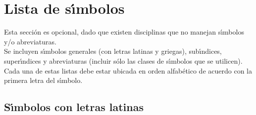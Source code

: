 \chapter*{Lista de s\'{\i}mbolos}
Esta secci\'{o}n es opcional, dado que existen disciplinas que no manejan s\'{\i}mbolos y/o abreviaturas.\\

Se incluyen s\'{\i}mbolos generales (con letras latinas y griegas), sub\'{\i}ndices, super\'{\i}ndices y abreviaturas (incluir s\'{o}lo las clases de s\'{\i}mbolos que se utilicen). Cada una de estas listas debe estar ubicada en orden alfab\'{e}tico de acuerdo con la primera letra del s\'{\i}mbolo.
\section*{S\'{\i}mbolos con letras latinas}
 \label{simbolos}
 \renewcommand{\arraystretch}{1.3}
